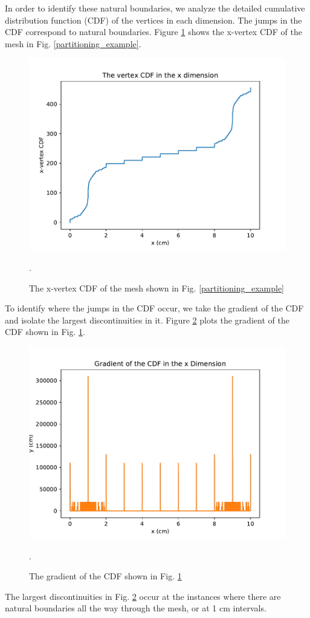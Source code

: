 In order to identify these natural boundaries, we analyze the detailed cumulative distribution function (CDF) of the vertices in each dimension. The jumps in the CDF correspond to natural boundaries. Figure \ref{vert_cdf} shows the x-vertex CDF of the mesh in Fig. \ref{partitioning_example}. 
\begin{figure}[H]
\centering
\includegraphics[scale=0.75]{../figures/xvertexcdf.pdf}
\caption{The x-vertex CDF of the mesh shown in Fig. \ref{partitioning_example}}.
\label{vert_cdf}
\end{figure}
To identify where the jumps in the CDF occur, we take the gradient of the CDF and isolate the largest discontinuities in it. Figure \ref{gradcdf} plots the gradient of the CDF shown in Fig. \ref{vert_cdf}.
\begin{figure}[H]
\centering
\includegraphics[scale=0.75]{../figures/gradcdf.pdf}
\caption{The gradient of the CDF shown in Fig. \ref{vert_cdf}}.
\label{gradcdf}
\end{figure}
The largest discontinuities in Fig. \ref{gradcdf} occur at the instances where there are natural boundaries all the way through the mesh, or at 1 cm intervals. 


